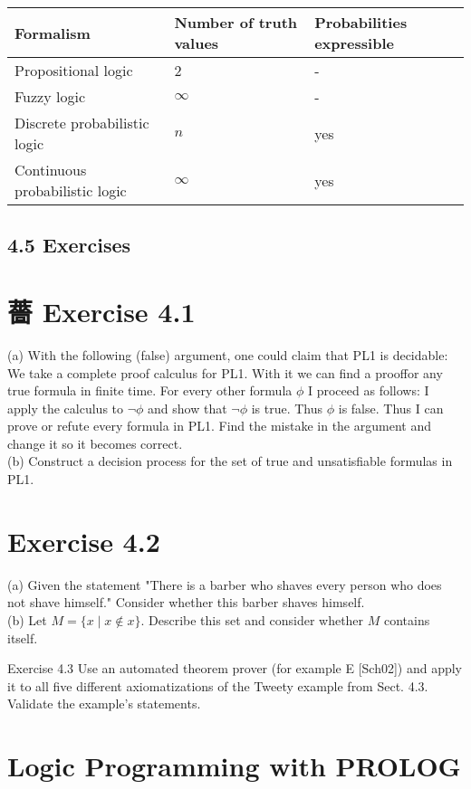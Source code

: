 \documentclass[10pt]{article}
\begin{document}
\begin{center}
\begin{tabular}{|l|l|l|}
\hline
Formalism & Number of truth values & Probabilities expressible \\
\hline
Propositional logic & 2 & - \\
\hline
Fuzzy logic & $\infty$ & - \\
\hline
Discrete probabilistic logic 
& $n$ & yes \\
\hline
Continuous probabilistic logic & $\infty$ & yes \\
\hline
\end{tabular}
\end{center}

\subsection*{4.5 Exercises}
\section*{薔 Exercise 4.1}
(a) With the following (false) argument, one could claim that PL1 is decidable: We take a complete proof calculus for PL1. With it we can find a prooffor any true formula in finite time. For every other formula $\phi$ I proceed as follows: I apply the calculus to $\neg \phi$ and show that $\neg \phi$ is true. Thus $\phi$ is false. Thus I can prove or refute every formula in PL1. Find the mistake in the argument and change it so it becomes correct.\\
(b) Construct a decision process for the set of true and unsatisfiable formulas in PL1.

\section*{Exercise 4.2}
(a) Given the statement "There is a barber who shaves every person who does not shave himself." Consider whether this barber shaves himself.\\
(b) Let $M=\{x \mid x \notin x\}$. Describe this set and consider whether $M$ contains itself.

Exercise 4.3 Use an automated theorem prover (for example E [Sch02]) and apply it to all five different axiomatizations of the Tweety example from Sect. 4.3. Validate the example's statements.

\section*{Logic Programming with PROLOG}
\end{document}
